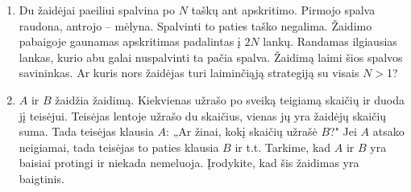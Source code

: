 \begin{enumerate}
\item {} Du žaidėjai paeiliui spalvina po
  $N$ taškų ant apskritimo. Pirmojo spalva raudona, antrojo – mėlyna.
  Spalvinti to paties taško negalima. Žaidimo pabaigoje gaunamas
  apskritimas padalintas į $2N$ lankų. Randamas ilgiausias lankas, kurio
  abu galai nuspalvinti ta pačia spalva. Žaidimą laimi šios spalvos
  savininkas. Ar kuris nors žaidėjas turi laiminčiąją strategiją su visais
  $N>$1? 

%

\item {} $A$ ir $B$ žaidžia žaidimą. Kiekvienas
  užrašo po sveiką teigiamą skaičių ir duoda jį teisėjui. Teisėjas lentoje
  užrašo du skaičius, vienas jų yra žaidėjų skaičių suma. Tada teisėjas
  klausia $A$: „Ar žinai, kokį skaičių užrašė $B$?" Jei $A$ atsako
  neigiamai, tada teisėjas to paties klausia $B$ ir t.t. Tarkime, kad $A$
  ir $B$ yra baisiai protingi ir niekada nemeluoja. Įrodykite, kad šis
  žaidimas yra baigtinis.


\end{enumerate}
